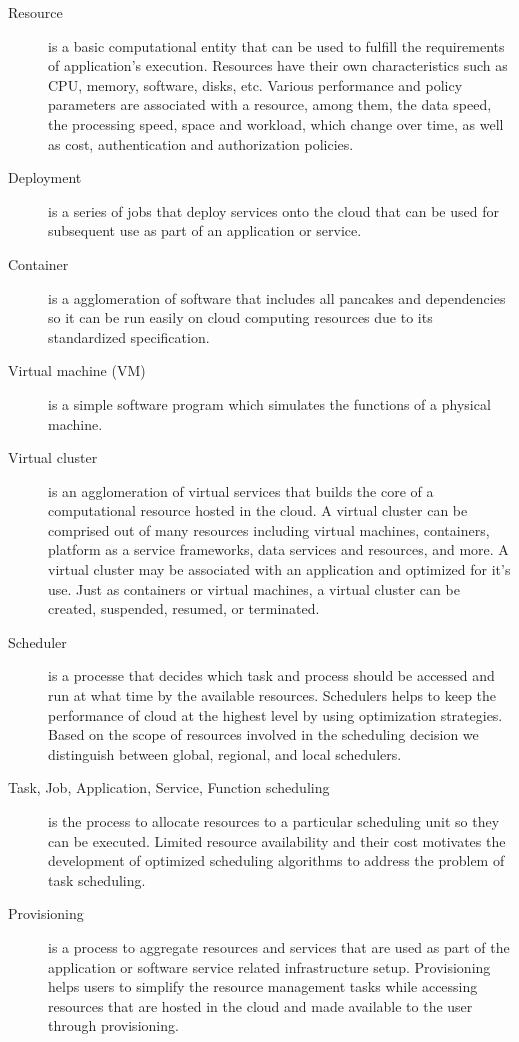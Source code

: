 \documentclass[final,5p,times,twocolumn]{elsarticle}
\begin{document}
\begin{description}

\item[Resource] is a basic computational entity that can
  be used to fulfill the requirements of application's execution.
  Resources have their own characteristics such as CPU, memory,
  software, disks, etc. Various performance and policy parameters are
  associated with a resource, among them, the data speed, the
  processing speed, space and workload, which change over time, as
  well as cost, authentication and authorization policies.

\item[Deployment] is a series of jobs that deploy services onto
  the cloud that can be used for subsequent use as part of an
  application or service.

\item[Container] is a agglomeration of software that includes all
  pancakes and dependencies so it can be run easily on cloud computing
  resources due to its standardized specification.

\item[Virtual machine (VM)] is a simple software program which
  simulates the functions of a physical machine.

\item[Virtual cluster] is an agglomeration of virtual services that
  builds the core of a computational resource hosted in the cloud. A
  virtual cluster can be comprised out of many resources including
  virtual machines, containers, platform as a service frameworks, data
  services and resources, and more. A virtual cluster may be
  associated with an application and optimized for it's use. Just as
  containers or virtual machines, a virtual cluster can be created, suspended,
  resumed, or terminated. 

\item[Scheduler] is a processe that decides which task and
  process should be accessed and run at what time by the available
  resources. Schedulers helps to keep the performance of cloud at the highest
  level by using optimization strategies. Based on the scope of resources
  involved in the scheduling decision we distinguish between global, 
  regional,  and local schedulers.
  
\item[Task, Job, Application, Service, Function scheduling] is the process
  to allocate resources to a particular scheduling unit so they can be
  executed. Limited resource availability and their cost motivates the
  development of optimized scheduling algorithms to address the
  problem of task scheduling.
  
\item[Provisioning] is a process to aggregate resources and services
  that are used as part of the application or software service
  related infrastructure setup. Provisioning helps users to simplify
  the resource management tasks while accessing resources that are
  hosted in the cloud and made available to the user through
  provisioning. 

\end{description}
\end{document}
